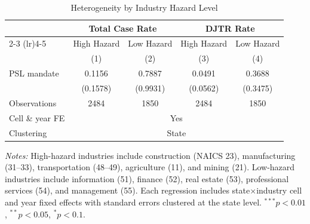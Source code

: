 \begin{table}[t]
\centering
\caption{Heterogeneity by Industry Hazard Level}
\label{tab:heterogeneity}
\begin{tabular}{lcccc}
\toprule
 & \multicolumn{2}{c}{Total Case Rate} & \multicolumn{2}{c}{DJTR Rate} \\
\cmidrule(lr){2-3} \cmidrule(lr){4-5}
 & High Hazard & Low Hazard & High Hazard & Low Hazard \\
 & (1) & (2) & (3) & (4) \\
\midrule
PSL mandate & 0.1156 & 0.7887 & 0.0491 & 0.3688 \\
 & (0.1578) & (0.9931) & (0.0562) & (0.3475) \\
\midrule
Observations & 2484 & 1850 & 2484 & 1850 \\
Cell \& year FE & \multicolumn{4}{c}{Yes} \\
Clustering & \multicolumn{4}{c}{State} \\
\bottomrule
\end{tabular}
\begin{tablenotes}
\small
\item \textit{Notes:} High-hazard industries include construction (NAICS 23), manufacturing (31--33), transportation (48--49), agriculture (11), and mining (21). Low-hazard industries include information (51), finance (52), real estate (53), professional services (54), and management (55). Each regression includes state$\times$industry cell and year fixed effects with standard errors clustered at the state level. $^{***}p<0.01$, $^{**}p<0.05$, $^{*}p<0.1$.
\end{tablenotes}
\end{table}

